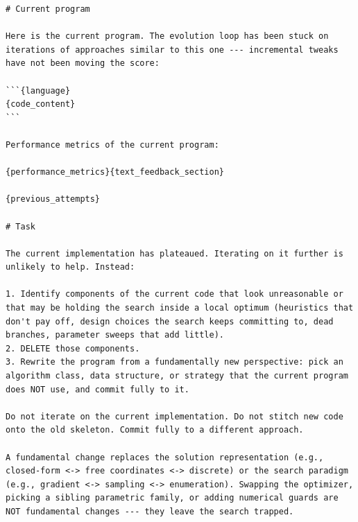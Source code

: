 \documentclass{llmxive}
\begin{document}
\begin{ttcolorbox}
\begin{lstlisting}[style=prompt]
# Current program

Here is the current program. The evolution loop has been stuck on iterations of approaches similar to this one --- incremental tweaks have not been moving the score:

```{language}
{code_content}
```

Performance metrics of the current program:

{performance_metrics}{text_feedback_section}

{previous_attempts}

# Task

The current implementation has plateaued. Iterating on it further is unlikely to help. Instead:

1. Identify components of the current code that look unreasonable or that may be holding the search inside a local optimum (heuristics that don't pay off, design choices the search keeps committing to, dead branches, parameter sweeps that add little).
2. DELETE those components.
3. Rewrite the program from a fundamentally new perspective: pick an algorithm class, data structure, or strategy that the current program does NOT use, and commit fully to it.

Do not iterate on the current implementation. Do not stitch new code onto the old skeleton. Commit fully to a different approach.

A fundamental change replaces the solution representation (e.g., closed-form <-> free coordinates <-> discrete) or the search paradigm (e.g., gradient <-> sampling <-> enumeration). Swapping the optimizer, picking a sibling parametric family, or adding numerical guards are NOT fundamental changes --- they leave the search trapped.


\end{lstlisting}
\end{ttcolorbox}
\end{document}
